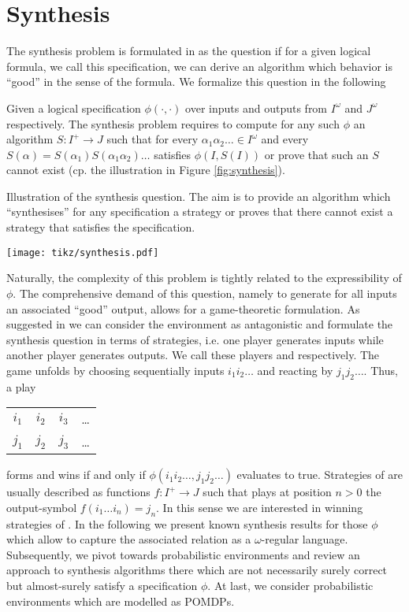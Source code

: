 \chapter{Synthesis}
\label{chapter:synthesis}
The synthesis problem is formulated in \cite{Church} as the question if for a 
given logical formula, we call this specification, we can derive an algorithm
which behavior is \enquote{good} in the sense of the formula. We formalize this
question in the following
\begin{definition}
  Given a logical specification  $\phi(\cdot, \cdot)$ over inputs and 
  outputs from $I^{\omega}$ and $J^{\omega}$ respectively. The synthesis 
  problem requires to compute for any such $\phi$ an algorithm 
  $S:I^{+}\rightarrow J$ such that for every 
  $\alpha_{1}\alpha_{2}\dots\in I^{\omega}$ and every 
  $S(\alpha) = S(\alpha_{1})S(\alpha_{1}\alpha_{2})\dots$ satisfies 
  $\phi(I, S(I))$ or prove that such an $S$ cannot exist (cp. the 
  illustration in Figure \ref{fig:synthesis}).
\end{definition}
\begin{drawing}
  \caption{Illustration of the synthesis question. The aim is to provide an 
  algorithm which \enquote{synthesises} for any specification a strategy or 
  proves that there cannot exist a strategy that satisfies the specification.}
  \label{fig:synthesis}
  \begin{center}
    \texttt{[image: tikz/synthesis.pdf]}
  \end{center}
\end{drawing}
Naturally, the complexity of this problem is tightly related to the 
expressibility of $\phi$. The comprehensive demand of this question, namely
to generate for all inputs an associated \enquote{good} output, allows for a
game-theoretic formulation. As suggested in \cite{SeqCondStrat} we can consider
the environment as antagonistic and formulate the synthesis question in terms
of strategies, i.e. one player generates inputs while another player generates
outputs. We call these players  and \outputp{} respectively. The game
unfolds by  choosing sequentially inputs $i_{1}i_{2}\dots$ and 
\outputp{} reacting by $j_{1}j_{2}\dots$. Thus, a play
\begin{tabular}{cccc}
  $i_{1}$ & $i_{2}$ & $i_{3}$ & \dots\\
  $j_{1}$ & $j_{2}$ & $j_{3}$ & \dots
\end{tabular}
forms and \outputp{} wins if and only if 
$\phi(i_{1}i_{2}\dots,j_{1}j_{2}\dots)$ evaluates to true. Strategies of 
\outputp{} are usually described as functions $f:I^{+}\rightarrow J$ such that
\outputp{} plays at position $n>0$ the output-symbol 
$f(i_{1}\dots i_{n}) = j_{n}$. In this sense we are interested in winning 
strategies of \outputp{}. In the following we present known synthesis results 
for those $\phi$ which allow to capture the associated relation as a 
$\omega$-regular language. Subsequently, we pivot towards probabilistic 
environments and review an approach to synthesis algorithms there which are not 
necessarily surely correct but almost-surely satisfy a specification $\phi$. 
At last, we consider probabilistic environments which are modelled as
\acp{POMDP}.

